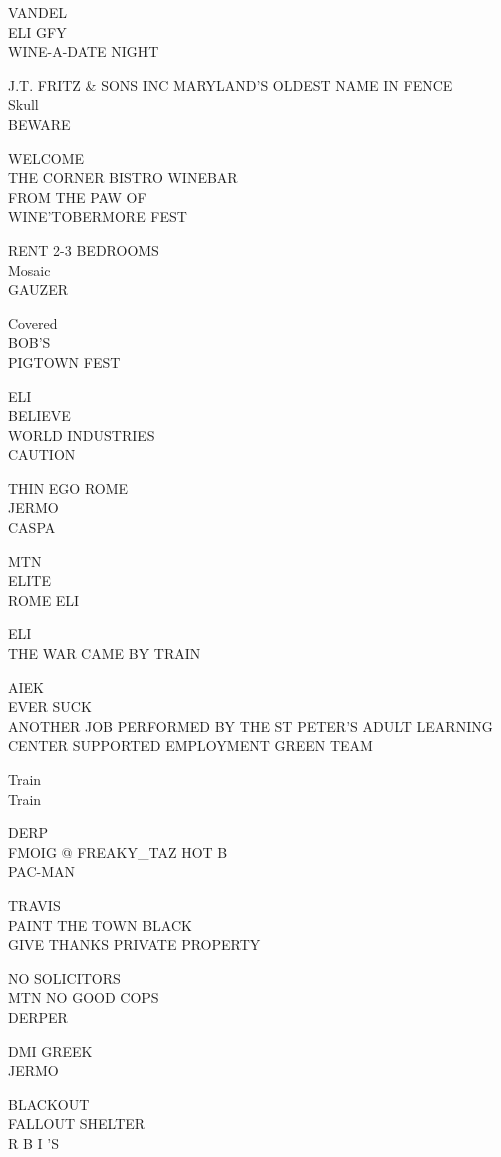 \documentclass[10pt,letterpaper]{article}
\begin{document}
VANDEL\\
ELI GFY\\
WINE{-}A{-}DATE NIGHT

J.T. FRITZ \& SONS INC MARYLAND'S OLDEST NAME IN FENCE\\
Skull\\
BEWARE

WELCOME\\
THE CORNER BISTRO WINEBAR\\
FROM THE PAW OF\\
WINE'TOBERMORE FEST

RENT 2{-}3 BEDROOMS\\
Mosaic\\
GAUZER

Covered\\
BOB'S\\
PIGTOWN FEST

ELI\\
BELIEVE\\
WORLD INDUSTRIES\\
CAUTION

THIN EGO ROME\\
JERMO\\
CASPA

MTN\\
ELITE\\
ROME ELI

ELI\\
THE WAR CAME BY TRAIN

AIEK\\
EVER SUCK\\
ANOTHER JOB PERFORMED BY THE ST PETER'S ADULT LEARNING CENTER SUPPORTED EMPLOYMENT GREEN TEAM

Train\\
Train

DERP\\
FMOIG @ FREAKY\_TAZ HOT B\\
PAC{-}MAN

TRAVIS\\
PAINT THE TOWN BLACK\\
GIVE THANKS PRIVATE PROPERTY

NO SOLICITORS\\
MTN NO GOOD COPS\\
DERPER

DMI GREEK\\
JERMO

BLACKOUT\\
FALLOUT SHELTER\\
R B I 'S
\end{document}
